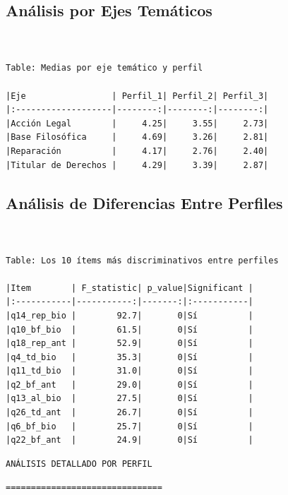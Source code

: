\documentclass[
  11pt,
  letterpaper,
  DIV=11,
  numbers=noendperiod]{scrartcl}
\begin{document}
\subsection{Análisis por Ejes
Temáticos}\label{anuxe1lisis-por-ejes-temuxe1ticos}

\begin{verbatim}


Table: Medias por eje temático y perfil

|Eje                 | Perfil_1| Perfil_2| Perfil_3|
|:-------------------|--------:|--------:|--------:|
|Acción Legal        |     4.25|     3.55|     2.73|
|Base Filosófica     |     4.69|     3.26|     2.81|
|Reparación          |     4.17|     2.76|     2.40|
|Titular de Derechos |     4.29|     3.39|     2.87|
\end{verbatim}

\subsection{Análisis de Diferencias Entre
Perfiles}\label{anuxe1lisis-de-diferencias-entre-perfiles}

\begin{verbatim}


Table: Los 10 ítems más discriminativos entre perfiles

|Item        | F_statistic| p_value|Significant |
|:-----------|-----------:|-------:|:-----------|
|q14_rep_bio |        92.7|       0|Sí          |
|q10_bf_bio  |        61.5|       0|Sí          |
|q18_rep_ant |        52.9|       0|Sí          |
|q4_td_bio   |        35.3|       0|Sí          |
|q11_td_bio  |        31.0|       0|Sí          |
|q2_bf_ant   |        29.0|       0|Sí          |
|q13_al_bio  |        27.5|       0|Sí          |
|q26_td_ant  |        26.7|       0|Sí          |
|q6_bf_bio   |        25.7|       0|Sí          |
|q22_bf_ant  |        24.9|       0|Sí          |
\end{verbatim}

\begin{verbatim}
ANÁLISIS DETALLADO POR PERFIL
\end{verbatim}

\begin{verbatim}
===============================
\end{verbatim}
\end{document}
